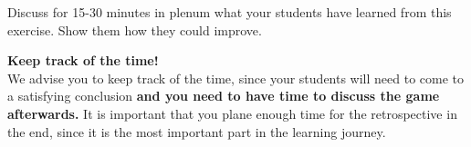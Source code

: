 \begin{hint}
    Discuss for 15-30 minutes in plenum what your students have learned from this exercise.
    Show them how they could improve.
\end{hint}
\begin{hint}
    \textbf{Keep track of the time!}
    \\

    We advise you to keep track of the time, since your students will need to come to a satisfying conclusion \textbf{and you need to have time to discuss the game afterwards.} It is important that you plane enough time for the retrospective in the end, since it is the most important part in the learning journey.
\end{hint}